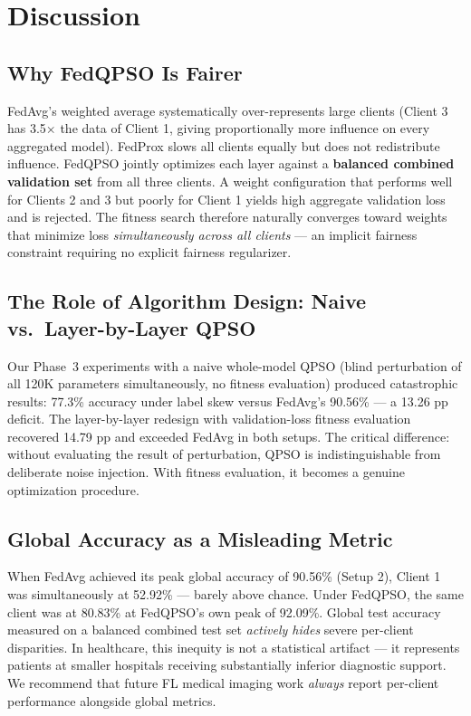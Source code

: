 \documentclass[conference]{IEEEtran}
\begin{document}
\section{Discussion}
\label{sec:discussion}

\subsection{Why FedQPSO Is Fairer}
FedAvg's weighted average systematically over-represents large clients (Client
3 has 3.5$\times$ the data of Client 1, giving proportionally more influence
on every aggregated model). FedProx slows all clients equally but does not
redistribute influence. FedQPSO jointly optimizes each layer against a
\textbf{balanced combined validation set} from all three clients. A weight
configuration that performs well for Clients 2 and 3 but poorly for Client 1
yields high aggregate validation loss and is rejected. The fitness search
therefore naturally converges toward weights that minimize loss
\emph{simultaneously across all clients} --- an implicit fairness constraint
requiring no explicit fairness regularizer.

\subsection{The Role of Algorithm Design: Naive vs.\ Layer-by-Layer QPSO}
Our Phase~3 experiments with a naive whole-model QPSO (blind perturbation of
all 120K parameters simultaneously, no fitness evaluation) produced
catastrophic results: 77.3\% accuracy under label skew versus FedAvg's
90.56\% --- a 13.26 pp deficit. The layer-by-layer redesign with
validation-loss fitness evaluation recovered 14.79 pp and exceeded FedAvg in
both setups. The critical difference: without evaluating the result of
perturbation, QPSO is indistinguishable from deliberate noise injection. With
fitness evaluation, it becomes a genuine optimization procedure.

\subsection{Global Accuracy as a Misleading Metric}
When FedAvg achieved its peak global accuracy of 90.56\% (Setup 2), Client 1
was simultaneously at 52.92\% --- barely above chance. Under FedQPSO, the same
client was at 80.83\% at FedQPSO's own peak of 92.09\%. Global test accuracy
measured on a balanced combined test set \emph{actively hides} severe
per-client disparities. In healthcare, this inequity is not a statistical
artifact --- it represents patients at smaller hospitals receiving substantially
inferior diagnostic support. We recommend that future FL medical imaging work
\emph{always} report per-client performance alongside global metrics.
\end{document}
